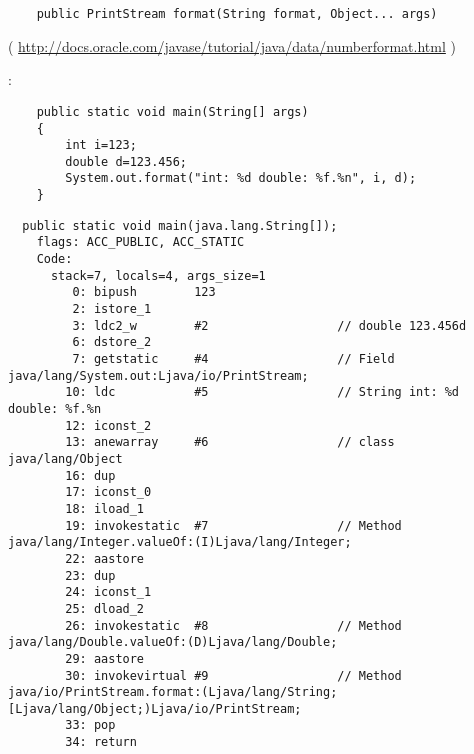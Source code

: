 


\begin{lstlisting}
	public PrintStream format(String format, Object... args)
\end{lstlisting}
( \url{http://docs.oracle.com/javase/tutorial/java/data/numberformat.html} )

:

\begin{lstlisting}
	public static void main(String[] args)
	{
		int i=123;
		double d=123.456;
		System.out.format("int: %d double: %f.%n", i, d);
	}
\end{lstlisting}

\begin{lstlisting}
  public static void main(java.lang.String[]);
    flags: ACC_PUBLIC, ACC_STATIC
    Code:
      stack=7, locals=4, args_size=1
         0: bipush        123
         2: istore_1      
         3: ldc2_w        #2                  // double 123.456d
         6: dstore_2      
         7: getstatic     #4                  // Field java/lang/System.out:Ljava/io/PrintStream;
        10: ldc           #5                  // String int: %d double: %f.%n
        12: iconst_2      
        13: anewarray     #6                  // class java/lang/Object
        16: dup           
        17: iconst_0      
        18: iload_1       
        19: invokestatic  #7                  // Method java/lang/Integer.valueOf:(I)Ljava/lang/Integer;
        22: aastore       
        23: dup           
        24: iconst_1      
        25: dload_2       
        26: invokestatic  #8                  // Method java/lang/Double.valueOf:(D)Ljava/lang/Double;
        29: aastore       
        30: invokevirtual #9                  // Method java/io/PrintStream.format:(Ljava/lang/String;[Ljava/lang/Object;)Ljava/io/PrintStream;
        33: pop           
        34: return        
\end{lstlisting}

